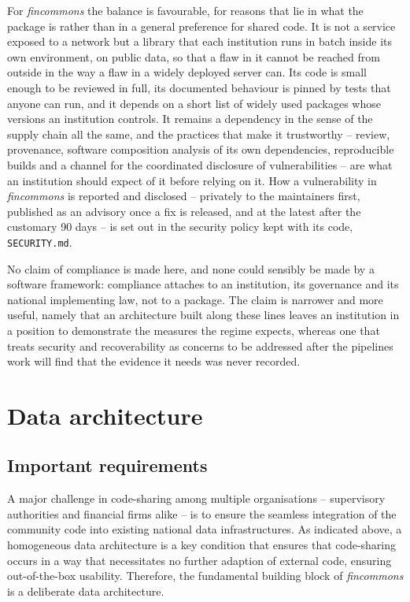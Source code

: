 \documentclass[a4paper, 11pt]{report}
\begin{document}
For \emph{fincommons} the balance is favourable, for reasons that lie in what the package is rather than in a general preference for shared code. It is not a service exposed to a network but a library that each institution runs in batch inside its own environment, on public data, so that a flaw in it cannot be reached from outside in the way a flaw in a widely deployed server can. Its code is small enough to be reviewed in full, its documented behaviour is pinned by tests that anyone can run, and it depends on a short list of widely used packages whose versions an institution controls. It remains a dependency in the sense of the supply chain all the same, and the practices that make it trustworthy -- review, provenance, software composition analysis of its own dependencies, reproducible builds and a channel for the coordinated disclosure of vulnerabilities -- are what an institution should expect of it before relying on it. How a vulnerability in \emph{fincommons} is reported and disclosed -- privately to the maintainers first, published as an advisory once a fix is released, and at the latest after the customary 90 days -- is set out in the security policy kept with its code, \verb|SECURITY.md|.

No claim of compliance is made here, and none could sensibly be made by a software framework: compliance attaches to an institution, its governance and its national implementing law, not to a package. The claim is narrower and more useful, namely that an architecture built along these lines leaves an institution in a position to demonstrate the measures the regime expects, whereas one that treats security and recoverability as concerns to be addressed after the pipelines work will find that the evidence it needs was never recorded.


\section{Data architecture\label{sec:intro-data}}

\subsection{Important requirements}

A major challenge in code-sharing among multiple organisations -- supervisory authorities and financial firms alike -- is to ensure the seamless integration of the community code into existing national data infrastructures. As indicated above, a homogeneous data architecture is a key condition that ensures that code-sharing occurs in a way that necessitates no further adaption of external code, ensuring out-of-the-box usability. Therefore, the fundamental building block of \emph{fincommons} is a deliberate data architecture.
\end{document}
